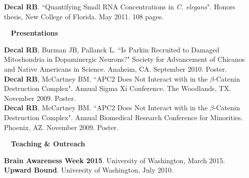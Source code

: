 \documentclass[a4paper,12pt]{article}
\newcommand{\resheading}[1]{{\hspace{-9pt} \colorbox{mygrey}{\begin{minipage}{\textwidth}{\textmd{~~\large \textbf{#1} \vphantom{p\^{E}}}}\end{minipage}}\vspace{6pt}} }
\begin{document}
       \textbf{Decal RB}. ``Quantifying Small RNA Concentrations in \textit{C. elegans}". Honors thesis, New College of Florida. May 2011. 108 pages.\\

    
\resheading{Presentations}

    
    \textbf{Decal RB}, Burman JB, Pallanck L. ``Is Parkin Recruited to Damaged Mitochondria in Dopaminergic Neurons?" Society for Advancement of Chicanos and Native Americans in Science.  Anaheim, CA. September 2010. Poster.\\

    \textbf{Decal RB}, McCartney BM. ``APC2 Does Not Interact with in the $\beta$-Catenin Destruction Complex". Annual Sigma Xi Conference. The Woodlands, TX. November 2009. Poster.\\

    \textbf{Decal RB}, McCartney BM. ``APC2 Does Not Interact with in the $\beta$-Catenin Destruction Complex". Annual Biomedical Research Conference for Minorities. Phoenix, AZ. November 2009. Poster.\\
        
\resheading{Teaching \& Outreach}

        \textbf{Brain Awareness Week 2015}. University of Washington, March 2015.\\
        

        \textbf{Upward Bound}. University of Washington, July 2010.\\
        


\end{document}
